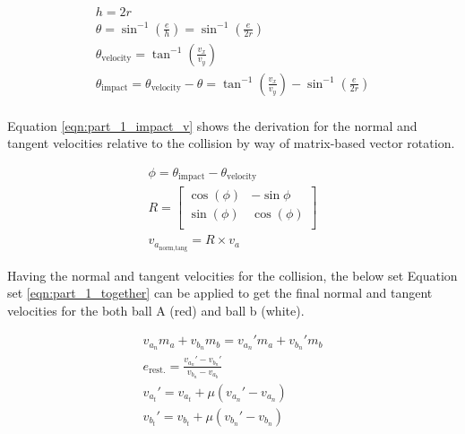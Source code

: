 \documentclass[12pt]{article}
\begin{document}
\begin{equation}
    \label{eqn:part_1_thetas}
    \begin{gathered}
        h = 2r \\
        \theta = \sin^{-1} \left(\frac{e}{h}\right) = \sin^{-1} \left(\frac{e}{2r}\right)\\
        \theta_\text{velocity} = \tan^{-1}\left(\frac{v_x}{v_y}\right)\\
        \theta_\text{impact} = \theta_\text{velocity} - \theta =  \tan^{-1}\left(\frac{v_x}{v_y}\right) - \sin^{-1} \left(\frac{e}{2r}\right)\\
    \end{gathered}
\end{equation}

Equation \ref{eqn:part_1_impact_v} shows the derivation for the normal and tangent velocities relative to the collision by
way of matrix-based vector rotation.

\begin{equation}
    \label{eqn:part_1_impact_v}
    \begin{gathered}
        \phi = \theta_\text{impact} - \theta_\text{velocity}\\
        R = 
        \left[
        \begin{matrix}
            \cos(\phi) & -\sin{\phi}\\
            \sin(\phi) & \cos(\phi)\\
        \end{matrix}
        \right]\\
        v_{a_\text{norm,tang}} = R \times v_a
    \end{gathered}
\end{equation}

Having the normal and tangent velocities for the collision, the below set Equation set \ref{eqn:part_1_together} can be applied to get the
final normal and tangent velocities for the both ball A (red) and ball b (white).

\begin{equation}
    \label{eqn:part_1_together}
    \begin{gathered}
        v_{a_n} m_a + v_{b_n} m_b = v_{a_n}' m_a + v_{b_n}' m_b\\
        e_\text{rest.} = \frac{v_{a_n}' - v_{b_n}'}{v_{b_n} - v_{a_b}}\\
        v_{a_t}' = v_{a_t} + \mu \left(v_{a_n}' - v_{a_n}\right)\\
        v_{b_t}' = v_{b_t} + \mu \left(v_{b_n}' - v_{b_n}\right)
    \end{gathered}
\end{equation}
\end{document}
